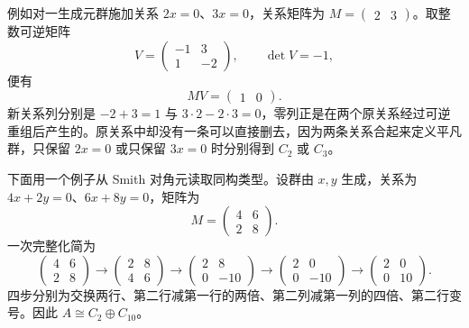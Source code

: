 \ProseParagraphBreak
例如对一生成元群施加关系 \(2x=0\)、\(3x=0\)，关系矩阵为 \(M=\begin{pmatrix}2&3\end{pmatrix}\)。取整数可逆矩阵
\[
	V=\begin{pmatrix}-1&3\\1&-2\end{pmatrix},
	\qquad \det V=-1,
\]
便有
\[
	MV=\begin{pmatrix}1&0\end{pmatrix}.
\]
新关系列分别是 \(-2+3=1\) 与 \(3\cdot2-2\cdot3=0\)，零列正是在两个原关系经过可逆重组后产生的。原关系中却没有一条可以直接删去，因为两条关系合起来定义平凡群，只保留 \(2x=0\) 或只保留 \(3x=0\) 时分别得到 \(C_2\) 或 \(C_3\)。

\ProseParagraphBreak
下面用一个例子从 Smith 对角元读取同构类型。设群由 \(x,y\) 生成，关系为 \(4x+2y=0\)、\(6x+8y=0\)，矩阵为
\[
	M=\begin{pmatrix}4&6\\2&8\end{pmatrix}.
\]
一次完整化简为
\[
	\begin{pmatrix}4&6\\2&8\end{pmatrix}
	\longrightarrow
	\begin{pmatrix}2&8\\4&6\end{pmatrix}
	\longrightarrow
	\begin{pmatrix}2&8\\0&-10\end{pmatrix}
	\longrightarrow
	\begin{pmatrix}2&0\\0&-10\end{pmatrix}
	\longrightarrow
	\begin{pmatrix}2&0\\0&10\end{pmatrix}.
\]
四步分别为交换两行、第二行减第一行的两倍、第二列减第一列的四倍、第二行变号。因此 \(A\cong C_2\oplus C_{10}\)。

